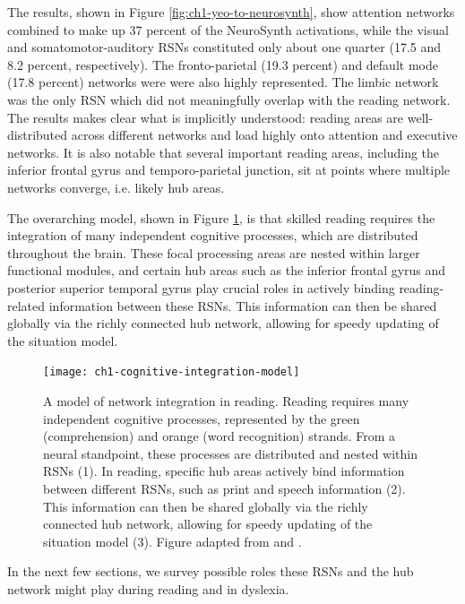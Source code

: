 The results, shown in Figure \ref{fig:ch1-yeo-to-neurosynth}, show attention networks combined to make up 37 percent of the NeuroSynth activations, while the visual and somatomotor-auditory RSNs constituted only about one quarter (17.5 and 8.2 percent, respectively). The fronto-parietal (19.3 percent) and default mode (17.8 percent) networks were were also highly represented. The limbic network was the only RSN which did not meaningfully overlap with the reading network. The results makes clear what is implicitly understood: reading areas are well-distributed across different networks and load highly onto attention and executive networks. It is also notable that several important reading areas, including the inferior frontal gyrus and temporo-parietal junction, sit at points where multiple networks converge, i.e. likely hub areas.


The overarching model, shown in Figure \ref{fig:ch1-cognitive-integration-model}, is that skilled reading requires the integration of many independent cognitive processes, which are distributed throughout the brain. These focal processing areas are nested within larger functional modules, and certain hub areas such as the inferior frontal gyrus and posterior superior temporal gyrus play crucial roles in actively binding reading-related information between these RSNs. This information can then be shared globally via the richly connected hub network, allowing for speedy updating of the situation model. 

\begin{figure}[t]
    \centering
    \texttt{[image: ch1-cognitive-integration-model]}
        \caption[Model of network integration in reading]{A model of network integration in reading. Reading requires many independent cognitive processes, represented by the green (comprehension) and orange (word recognition) strands. From a neural standpoint, these processes are distributed and nested within RSNs (1). In reading, specific hub areas actively bind information between different RSNs, such as print and speech information (2). This information can then be shared globally via the richly connected hub network, allowing for speedy updating of the situation model (3). Figure adapted from \cite{Scarborough2001} and \cite{Bailey2018}.}
    \label{fig:ch1-cognitive-integration-model}
\end{figure}

In the next few sections, we survey possible roles these RSNs and the hub network might play during reading and in dyslexia. 

